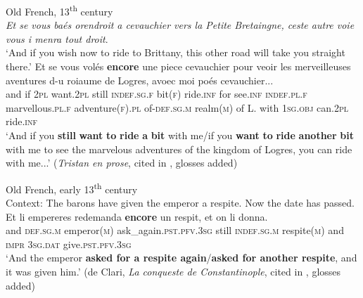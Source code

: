 \begin{exe}
	
		\ex Old French, 13\textsuperscript{th} century\label{exAppendixOldFrenchRide}\\
	\textit{Et se vous baés orendroit a cevauchier vers la Petite Bretaingne, ceste autre voie vous i menra tout droit}.\\
	\lq And if you wish now to ride to Brittany, this other road will take you straight there.\rq{}
	\exi{}
	\gll  Et se vous volés \textbf{encore} une piece cevauchier pour veoir les merveilleuses aventures d-u roiaume de Logres, avoec moi poés cevauchier...\\
	and if 2\textsc{pl} want.2\textsc{pl} still \textsc{indef}.\textsc{sg}.\textsc{f} bit(\textsc{f}) ride.\textsc{inf} for see.\textsc{inf} \textsc{indef}.\textsc{pl}.\textsc{f} marvellous.\textsc{pl}.\textsc{f} adventure(\textsc{f}).\textsc{pl} of-\textsc{def}.\textsc{sg}.\textsc{m} realm(\textsc{m}) of L. with 1\textsc{sg}.\textsc{obj} can.2\textsc{pl} ride.\textsc{inf}\\
	\glt \lq And if you \textbf{still} \textbf{want} \textbf{to} \textbf{ride} \textbf{a} \textbf{bit} with me/if you \textbf{want} \textbf{to} \textbf{ride} \textbf{another} \textbf{bit} with me to see the marvelous adventures of the kingdom of Logres, you can ride with me...\rq{ }(\textit{Tristan en prose}, cited in \cite[163]{MosegaardHansen2008}, glosses added)
	
	\ex Old French, early 13\textsuperscript{th} century\label{exAppendixOldFrenchRespite}\\
	Context: The barons have given the emperor a respite. Now the date has passed.\\
	\gll Et li empereres redemanda \textbf{encore} un respit, et on li donna.\\
	and \textsc{def}.\textsc{sg}.\textsc{m} emperor(\textsc{m}) ask\_again.\textsc{pst}.\textsc{pfv}.3\textsc{sg} still \textsc{indef}.\textsc{sg}.\textsc{m} respite(\textsc{m}) and \textsc{impr} 3\textsc{sg}.\textsc{dat} give.\textsc{pst}.\textsc{pfv}.3\textsc{sg}\\
	\glt \lq And the emperor \textbf{asked for a respite again}/\textbf{asked for another respite}, and it was given him.\rq{ }(de Clari, \textit{La conqueste de Constantinople}, cited in \cite[163–164]{MosegaardHansen2008}, glosses added)
\end{exe}

